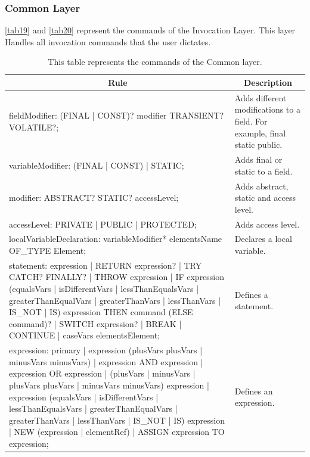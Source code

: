 \subsubsection{Common Layer}
\autoref{tab19} and \autoref{tab20} represent the commands of the Invocation Layer.  This layer Handles all invocation commands that the user dictates.

\begin{table}[H]
	\centering
	\begin{tabular}{|p{8cm}|p{7cm}|}
		\hline
		\multicolumn{1}{|c|}{{\bf Rule}}                                                                                                                                                                                                                                                                                                                                                                                                      & \multicolumn{1}{c|}{{\bf Description}} \\ \hline
		fieldModifier: (FINAL | CONST)? modifier TRANSIENT? VOLATILE?; & Adds different modifications to a field. For example, final static public. \\ \hline
		variableModifier: (FINAL | CONST) | STATIC; & Adds final or static to a field. \\ \hline
		modifier: ABSTRACT? STATIC? accessLevel; & Adds abstract, static and access level. \\ \hline
		accessLevel: PRIVATE | PUBLIC | PROTECTED; & Adds access level. \\ \hline
		localVariableDeclaration: variableModifier* elementsName OF\_TYPE Element; & Declares a local variable. \\ \hline
		statement: expression | RETURN expression? | TRY CATCH? FINALLY? | THROW expression | IF expression (equalsVars | isDifferentVars | lessThanEqualsVars | greaterThanEqualVars | greaterThanVars | lessThanVars | IS\_NOT | IS) expression THEN command (ELSE command)? | SWITCH expression? | BREAK | CONTINUE | caseVars elementsElement; & Defines a statement. \\ \hline
		expression: primary | expression (plusVars plusVars | minusVars minusVars) | expression AND expression | expression OR expression | (plusVars | minusVars | plusVars plusVars | minusVars minusVars) expression | expression (equalsVars | isDifferentVars | lessThanEqualsVars | greaterThanEqualVars | greaterThanVars | lessThanVars | IS\_NOT | IS) expression | NEW (expression | elementRef) | ASSIGN expression TO expression; & Defines an expression. \\ \hline
	\end{tabular}
		\caption{This table represents the commands of the Common layer.}
		\label{tab19}
\end{table}

